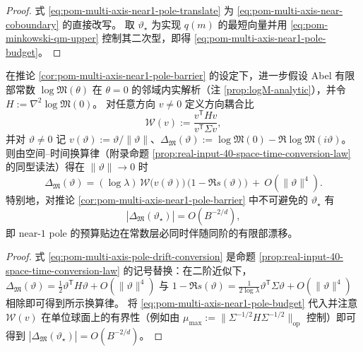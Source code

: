 \begin{proof}
式 \eqref{eq:pom-multi-axis-near1-pole-translate} 为 \eqref{eq:pom-multi-axis-near-coboundary} 的直接改写。
取 \(\vartheta_\star\) 为实现 \(q(m)\) 的最短向量并用 \eqref{eq:pom-minkowski-qm-upper} 控制其二次型，即得 \eqref{eq:pom-multi-axis-near1-pole-budget}。
\end{proof}

\begin{corollary}\label{cor:pom-multi-axis-pole-drift-binding}
在推论 \ref{cor:pom-multi-axis-near1-pole-barrier} 的设定下，进一步假设 Abel 有限部常数 \(\log\mathfrak{M}(\theta)\) 在 \(\theta=0\) 的邻域内实解析（注 \ref{prop:logM-analytic}），并令
\(
H:=\nabla^2\log\mathfrak{M}(0)
\)。
对任意方向 \(v\neq 0\) 定义方向耦合比
\[
\mathcal{W}(v):=\frac{v^{\mathsf T}Hv}{v^{\mathsf T}\Sigma v},
\]
并对 \(\vartheta\neq 0\) 记 \(v(\vartheta):=\vartheta/\|\vartheta\|\)、\(\Delta_{\mathfrak{M}}(\vartheta):=\log\mathfrak{M}(0)-\Re\log\mathfrak{M}(i\vartheta)\)。
则由空间--时间换算律（附录命题 \ref{prop:real-input-40-space-time-conversion-law} 的同型读法）得在 \(\|\vartheta\|\to 0\) 时
\begin{equation}\label{eq:pom-multi-axis-pole-drift-conversion}
\Delta_{\mathfrak{M}}(\vartheta)
=(\log\lambda)\,\mathcal{W}\bigl(v(\vartheta)\bigr)\,\bigl(1-\Re s(\vartheta)\bigr)\ +\ O(\|\vartheta\|^4).
\end{equation}
特别地，对推论 \ref{cor:pom-multi-axis-near1-pole-barrier} 中不可避免的 \(\vartheta_\star\) 有
\[
|\Delta_{\mathfrak{M}}(\vartheta_\star)|=O(B^{-2/d}),
\]
即 near-\(1\) pole 的预算贴边在常数层必同时伴随同阶的有限部漂移。
\end{corollary}

\begin{proof}
式 \eqref{eq:pom-multi-axis-pole-drift-conversion} 是命题 \ref{prop:real-input-40-space-time-conversion-law} 的记号替换：在二阶近似下，
\(
\Delta_{\mathfrak{M}}(\vartheta)=\frac12\vartheta^{\mathsf T}H\vartheta+O(\|\vartheta\|^4)
\)
与
\(
1-\Re s(\vartheta)=\frac{1}{2\log\lambda}\vartheta^{\mathsf T}\Sigma\vartheta+O(\|\vartheta\|^4)
\)
相除即可得到所示换算律。
将 \eqref{eq:pom-multi-axis-near1-pole-budget} 代入并注意 \(\mathcal{W}(v)\) 在单位球面上的有界性（例如由 \(\mu_{\max}:=\|\Sigma^{-1/2}H\Sigma^{-1/2}\|_{\mathrm{op}}\) 控制）即可得到 \(|\Delta_{\mathfrak{M}}(\vartheta_\star)|=O(B^{-2/d})\)。
\end{proof}

